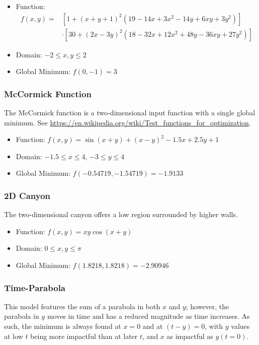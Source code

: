 \begin{itemize}
  \item Function:
    \begin{align}
      f(x,y) =& \left[1+(x+y+1)^2\left(19-14x+3x^2-14y+6xy+3y^2\right)\right] \\ \nonumber
        & \cdot\left[30+(2x-3y)^2(18-32x+12x^2+48y-36xy+27y^2)\right]
    \end{align}
  \item Domain: $-2 \leq x,y \leq 2$
  \item Global Minimum: $f(0,-1)=3$
\end{itemize}

\subsubsection{McCormick Function}
The McCormick function is a two-dimensional input function with a single global minimum.
See \url{https://en.wikipedia.org/wiki/Test_functions_for_optimization}.

\begin{itemize}
  \item Function: $f(x,y) = \sin(x+y) + (x-y)^2 - 1.5x + 2.5y + 1$
  \item Domain: $-1.5 \leq x \leq 4$, $-3 \leq y \leq 4$
  \item Global Minimum: $f(-0.54719,-1.54719) = -1.9133$
\end{itemize}


\subsubsection{2D Canyon}
The two-dimensional canyon offers a low region surrounded by higher walls.

\begin{itemize}
  \item Function: $f(x,y) = xy\cos(x+y)$
  \item Domain: $0 \leq x,y \leq \pi$
  \item Global Minimum: $f(1.8218,1.8218)=-2.90946$
\end{itemize}




\subsubsection{Time-Parabola}
This model features the sum of a parabola in both $x$ and $y$; however, the parabola in $y$ moves in time and
has a reduced magnitude as time increases. As such, the minimum is always found at $x=0$ and at $(t-y)=0$, with
$y$ values at low $t$ being more impactful than at later $t$, and $x$ as impactful as $y(t=0)$.

